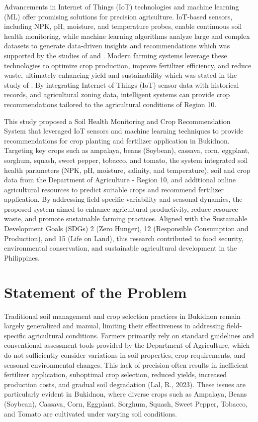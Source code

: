 {	Advancements in Internet of Things (IoT) technologies and machine learning (ML) offer promising solutions for precision agriculture. IoT-based sensors, including NPK, pH, moisture, and temperature probes, enable continuous soil health monitoring, while machine learning algorithms analyze large and complex datasets to generate data-driven insights and recommendations which was supported by the studies of \cite{Kumar2024} and \cite{Lavanya2024}. Modern farming systems leverage these technologies to optimize crop production, improve fertilizer efficiency, and reduce waste, ultimately enhancing yield and sustainability which was stated in the study of \cite{Elbasi2023}. By integrating Internet of Things (IoT) sensor data with historical records, and agricultural zoning data, intelligent systems can provide crop recommendations tailored to the agricultural conditions of Region 10.
	
	This study proposed a Soil Health Monitoring and Crop Recommendation System that leveraged IoT sensors and machine learning techniques to provide recommendations for crop planting and fertilizer application in Bukidnon. Targeting key crops such as ampalaya, beans (Soybean), cassava, corn, eggplant, sorghum, squash, sweet pepper, tobacco, and tomato, the system integrated soil health parameters (NPK, pH, moisture, salinity, and temperature), soil and crop data from the Department of Agriculture - Region 10, and additional online agricultural resources to predict suitable crops and recommend fertilizer application. By addressing field-specific variability and seasonal dynamics, the proposed system aimed to enhance agricultural productivity, reduce resource waste, and promote sustainable farming practices. Aligned with the Sustainable Development Goals (SDGs) 2 (Zero Hunger), 12 (Responsible Consumption and Production), and 15 (Life on Land), this research contributed to food security, environmental conservation, and sustainable agricultural development in the Philippines.
	
	
	\section{Statement of the Problem}
	
	
	Traditional soil management and crop selection practices in Bukidnon remain largely generalized and manual, limiting their effectiveness in addressing field-specific agricultural conditions. Farmers primarily rely on standard guidelines and conventional assessment tools provided by the Department of Agriculture, which do not sufficiently consider variations in soil properties, crop requirements, and seasonal environmental changes. This lack of precision often results in inefficient fertilizer application, suboptimal crop selection, reduced yields, increased production costs, and gradual soil degradation (Lal, R., 2023). These issues are particularly evident in Bukidnon, where diverse crops such as Ampalaya, Beans (Soybean), Cassava, Corn, Eggplant, Sorghum, Squash, Sweet Pepper, Tobacco, and Tomato are cultivated under varying soil  conditions.
	
}
